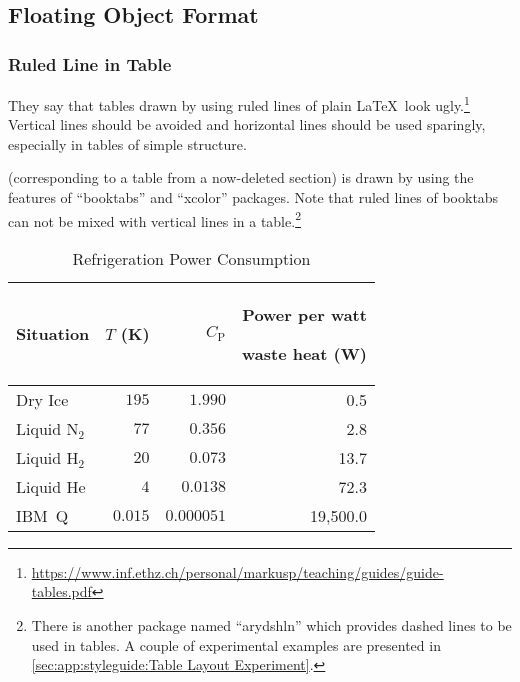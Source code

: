 \subsection{Floating Object Format}
\label{sec:app:styleguide:Floating Object Format}

\subsubsection{Ruled Line in Table}
\label{sec:app:styleguide:Ruled Line in Table}

They say that tables drawn by using ruled lines of plain \LaTeX\
look ugly.\footnote{
  \url{https://www.inf.ethz.ch/personal/markusp/teaching/guides/guide-tables.pdf}
}
Vertical lines should be avoided and horizontal lines should be
used sparingly, especially in tables of simple structure.


\newcommand{\TLo}{T_\mathrm{L}}
\newcommand{\THi}{T_\mathrm{H}}
\newcommand{\CPf}{C_\mathrm{P}}

(corresponding to a table from a now-deleted section)
is drawn by using the features of ``booktabs'' and ``xcolor'' packages.
Note that ruled lines of booktabs can not be mixed with
vertical lines in a table.\footnote{
  There is another package named ``arydshln'' which provides dashed lines
  to be used in tables.
  A couple of experimental examples are presented in
  \cref{sec:app:styleguide:Table Layout Experiment}.
}

\begin{table}
\renewcommand*{\arraystretch}{1.2}\centering\small
\begin{tabular}{lrrr}\toprule
Situation
	& $T$ (K)
		& $\CPf$ & \parbox[b]{.75in}{\raggedleft Power per watt\par waste heat (W)} \\
\midrule
Dry Ice
	& $195$
		& $1.990$
			& 0.5 \\
Liquid N$_2$
	& $77$
		& $0.356$
			& 2.8 \\
Liquid H$_2$
	& $20$
		& $0.073$
			& 13.7 \\
Liquid He
	& $4$
		& $0.0138$
			& 72.3 \\
IBM~Q	& $0.015$
		& $0.000051$
			& 19,500.0 \\
\bottomrule
\end{tabular}
\caption{Refrigeration Power Consumption}
\label{tab:app:styleguide:Refrigeration Power Consumption}
\end{table}

